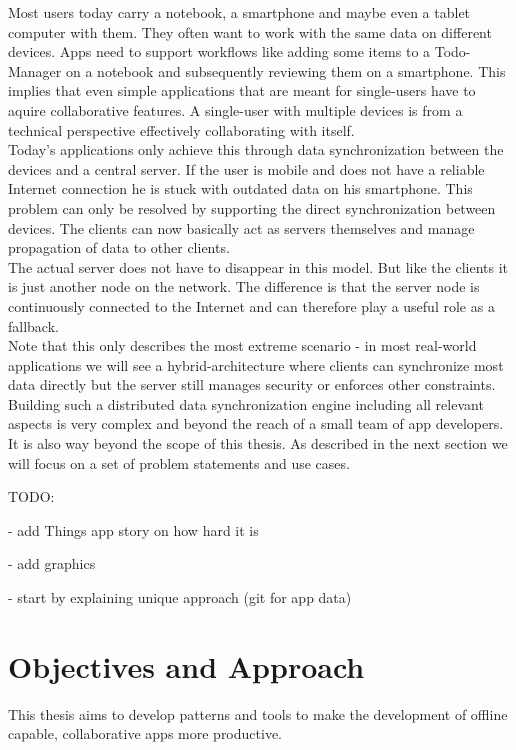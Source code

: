 Most users today carry a notebook, a smartphone and maybe even a tablet computer with them.
They often want to work with the same data on different devices.
Apps need to support workflows like adding some items to a Todo-Manager on a notebook and subsequently reviewing them on a smartphone.
This implies that even simple applications that are meant for single-users have to aquire collaborative features.
A single-user with multiple devices is from a technical perspective effectively collaborating with itself.\\
Today's applications only achieve this through  data synchronization between the devices and a central server.
If the user is mobile and does not have a reliable Internet connection he is stuck with outdated data on his smartphone.
This problem can only be resolved by supporting the direct synchronization between devices.
The clients can now basically act as servers themselves and manage propagation of data to other clients.\\
The actual server does not have to disappear in this model.
But like the clients it is just another node on the network.
The difference is that the server node is continuously connected to the Internet and can therefore play a useful role as a fallback.\\
Note that this only describes the most extreme scenario - in most real-world applications we will see a hybrid-architecture where clients can synchronize most data directly but the server still manages security or enforces other constraints.\\
Building such a distributed data synchronization engine including all relevant aspects is very complex and beyond the reach of a small team of app developers.
It is also way beyond the scope of this thesis.
As described in the next section we will focus on a set of problem statements and use cases.

TODO:

- add Things app story on how hard it is

- add graphics

- start by explaining unique approach (git for app data)

\section{Objectives and Approach}

This thesis aims to develop patterns and tools to make the development of offline capable, collaborative apps more productive.\\

